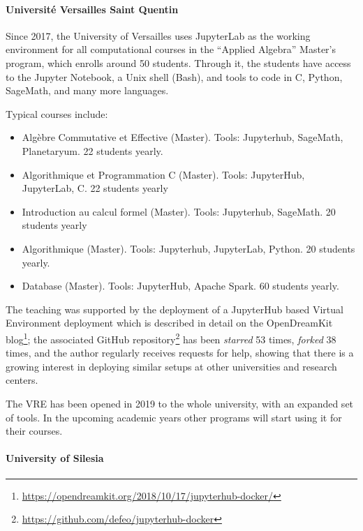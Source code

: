 \documentclass{deliverablereport}
\begin{document}
\paragraph{Université Versailles Saint Quentin}
  Since 2017, the University of Versailles uses JupyterLab as the
  working environment for all computational courses in the ``Applied
  Algebra'' Master's program, which enrolls around 50 students.
  Through it, the students have access to the Jupyter Notebook, a Unix
  shell (Bash), and tools to code in C, Python, SageMath, and many
  more languages.

  Typical courses include:
  \begin{itemize}
  \item Algèbre Commutative et Effective (Master). Tools: Jupyterhub,
    SageMath, Planetaryum. 22 students yearly.
  \item Algorithmique et Programmation C (Master). Tools: JupyterHub,
    JupyterLab, C. 22 students yearly
  \item Introduction au calcul formel (Master). Tools: Jupyterhub,
    SageMath. 20 students yearly
  \item Algorithmique (Master). Tools: Jupyterhub, JupyterLab, Python. 20
    students yearly.
  \item Database (Master). Tools: JupyterHub, Apache Spark. 60 students yearly.
  \end{itemize}

  The teaching was supported by the deployment of a JupyterHub based
  Virtual Environment deployment which is described in detail on
  the OpenDreamKit
  blog\footnote{\url{https://opendreamkit.org/2018/10/17/jupyterhub-docker/}};
  the associated GitHub
  repository\footnote{\url{https://github.com/defeo/jupyterhub-docker}}
  has been \emph{starred} 53 times, \emph{forked} 38 times, and the
  author regularly receives requests for help, showing that there is a
  growing interest in deploying similar setups at other universities
  and research centers.

  The VRE has been opened in 2019 to the whole university, with an
  expanded set of tools. In the upcoming academic years other programs
  will start using it for their courses.

\paragraph{University of Silesia}
\end{document}
